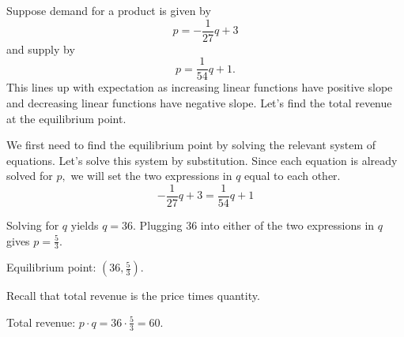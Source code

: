 \begin{example}
    Suppose demand for a product is given by
    \[p = -\frac{1}{27}q+3\] and supply by
    \[p = \frac{1}{54}q+1.\]
    This lines up with expectation as increasing linear functions have positive slope and decreasing linear functions have negative slope. Let's find the total revenue at the equilibrium point.

    \begin{solution}
        We first need to find the equilibrium point by solving the relevant system of equations. Let's solve this system by substitution. Since each equation is already solved for \(p,\) we will set the two expressions in \(q\) equal to each other.
        \[-\frac{1}{27}q + 3 = \frac{1}{54}q+1\]

        Solving for \(q\) yields \(q=36.\) Plugging \(36\) into either of the two expressions in \(q\) gives \(p = \frac{5}{3}.\)

        Equilibrium point: \(\left(36, \frac{5}{3}\right).\)

        Recall that total revenue is the price times quantity.

        Total revenue: \(p\cdot q = 36 \cdot \frac{5}{3} = 60.\)
    \end{solution}
\end{example}

